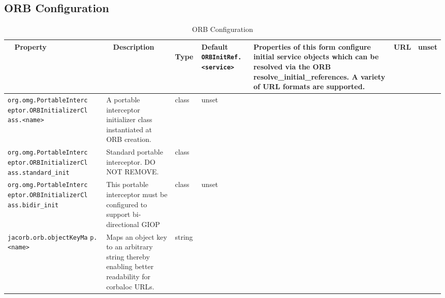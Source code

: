 \subsection{ORB Configuration}
\begin{small}
\begin{longtable}{|p{5cm}|p{7.5cm}|p{1.5cm}|p{1.5cm}|}
\caption{ORB Configuration}\\
\hline
~ \hfill \textbf {Property} \hfill ~ & ~ \hfill \textbf {Description}
\hfill ~ & ~ \hfill \textbf {Type} \hfill ~ & \hfill \textbf{Default} \endhead
\hline
\verb"ORBInitRef.<service>" & Properties of this form configure
initial service objects which can be resolved via the ORB
resolve\_initial\_references. A variety of URL formats are
supported. & URL & unset \\
\hline
\verb"org.omg.PortableInterc"
\verb"eptor.ORBInitializerCl"
\verb"ass.<name>" & A portable interceptor initializer class
instantiated at ORB creation. & class & unset \\
\hline
\verb"org.omg.PortableInterc"
\verb"eptor.ORBInitializerCl"
\verb"ass.standard_init" & Standard portable interceptor. DO NOT
REMOVE. & class &  \\
\hline
\verb"org.omg.PortableInterc"
\verb"eptor.ORBInitializerCl"
\verb"ass.bidir_init" & This portable interceptor must be configured
to support bi-directional GIOP & class & unset \\
\hline
\verb"jacorb.orb.objectKeyMa"
\verb"p.<name>" & Maps an object key to an arbitrary string thereby
enabling better readability for corbaloc URLs. & string & \\
\hline


\end{longtable}
\end{small}
